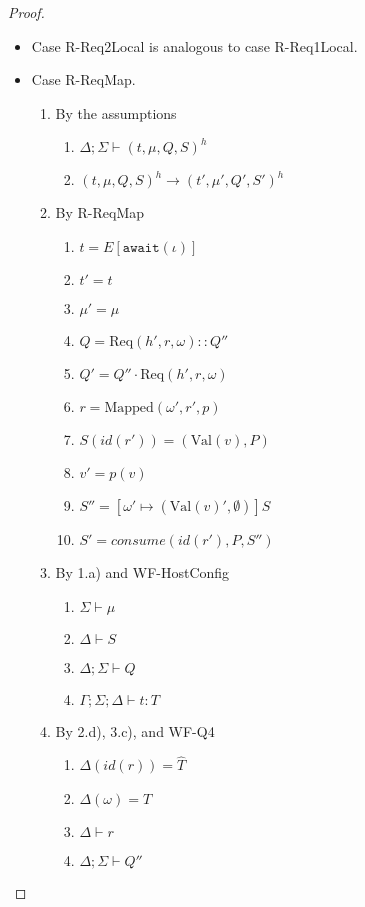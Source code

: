\documentclass{article}
\theoremstyle{definition}
\newcommand{\Req}[3]{\text{Req}(#1, #2, #3)}
\newcommand{\Val}[1]{\text{Val}(#1)}
\begin{document}
\begin{proof}
\begin{itemize}
\item Case R-Req2Local is analogous to case R-Req1Local.

\item Case R-ReqMap.
\begin{enumerate}
\item By the assumptions
  \begin{enumerate}[label=(\alph*)]
  \item $\Delta ; \Sigma \vdash (t, \mu, Q, S)^h$
  \item $(t, \mu, Q, S)^h \longrightarrow (t', \mu', Q', S')^h$
  \end{enumerate}
\item By R-ReqMap
  \begin{enumerate}[label=(\alph*)]
  \item $t = E[\texttt{await}(\iota)]$
  \item $t' = t$
  \item $\mu' = \mu$
  \item $Q = {\Req {h'} r \omega} :: Q''$
  \item $Q' = Q'' \cdot {\Req {h'} r \omega}$
  \item $r = \text{Mapped}(\omega', r', p)$
  \item $S(id(r')) = ({\Val v}, P)$
  \item $v' = p(v)$  %
  \item $S'' = [\omega' \mapsto ({\Val v'}, \emptyset)]S$
  \item $S' = consume(id(r'), P, S'')$  %
  \end{enumerate}
\item By 1.a) and WF-HostConfig
  \begin{enumerate}[label=(\alph*)]
  \item $\Sigma \vdash \mu$
  \item $\Delta \vdash S$
  \item $\Delta ; \Sigma \vdash Q$
  \item $\Gamma ; \Sigma ; \Delta \vdash t : T$
  \end{enumerate}
\item By 2.d), 3.c), and WF-Q4
  \begin{enumerate}[label=(\alph*)]
  \item $\Delta(id(r)) = \hat{T}$
  \item $\Delta(\omega) = \hat{T}$
  \item $\Delta \vdash r$
  \item $\Delta ; \Sigma \vdash Q''$
  \end{enumerate}

\end{enumerate}
\end{itemize}
\end{proof}
\end{document}
